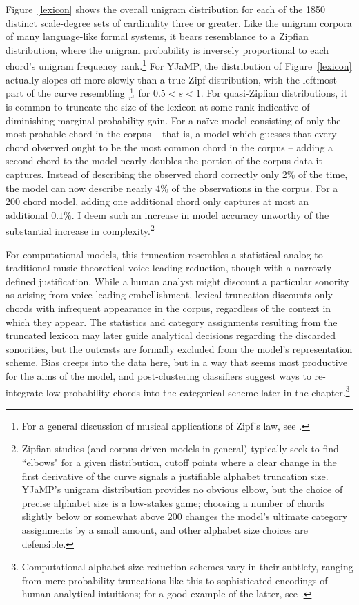 Figure~\ref{lexicon} shows the overall unigram distribution for each of the 1850 distinct scale-degree sets of cardinality three or greater.  Like the unigram corpora of many language-like formal systems, it bears resemblance to a Zipfian distribution, where the unigram probability is inversely proportional to each chord's unigram frequency rank.\footnote{For a general discussion of musical applications of Zipf's law, see \cite{zanette2006}.}  For YJaMP, the distribution of Figure~\ref{lexicon} actually slopes off more slowly than a true Zipf distribution, with the leftmost part of the curve resembling $\frac{1}{r^s}$ for $0.5 < s < 1$.  For quasi-Zipfian distributions, it is common to truncate the size of the lexicon at some rank indicative of diminishing marginal probability gain. For a na\"{i}ve model consisting of only the most probable chord in the corpus -- that is, a model which guesses that every chord observed ought to be the most common chord in the corpus -- adding a second chord to the model nearly doubles the portion of the corpus data it captures.  Instead of describing the observed chord correctly only 2\% of the time, the model can now describe nearly 4\% of the observations in the corpus.  For a 200 chord model, adding one additional chord only captures at most an additional $0.1\%$.  I deem such an increase in model accuracy unworthy of the substantial increase in complexity.\footnote{Zipfian studies (and corpus-driven models in general) typically seek to find ``elbows" for a given distribution, cutoff points where a clear change in the first derivative of the curve signals a justifiable alphabet truncation size.  YJaMP's unigram distribution provides no obvious elbow, but the choice of precise alphabet size is a low-stakes game; choosing a number of chords slightly below or somewhat above 200 changes the model's ultimate category assignments by a small amount, and other alphabet size choices are defensible.}

For computational models, this truncation resembles a statistical analog to traditional music theoretical  voice-leading reduction, though with a narrowly defined justification.  While a human analyst might discount a particular sonority as arising from voice-leading embellishment, lexical truncation discounts only chords with infrequent appearance in the corpus, regardless of the context in which they appear.  The statistics and category assignments resulting from the truncated lexicon may later guide analytical decisions regarding the discarded sonorities, but the outcasts are formally excluded from the model's representation scheme.  Bias creeps into the data here, but in a way that seems most productive for the aims of the model, and post-clustering classifiers suggest ways to re-integrate low-probability chords into the categorical scheme later in the chapter.\footnote{Computational alphabet-size reduction schemes vary in their subtlety, ranging from mere probability truncations like this to sophisticated encodings of human-analytical intuitions; for a good example of the latter, see \cite{white2013alphabet}.}

